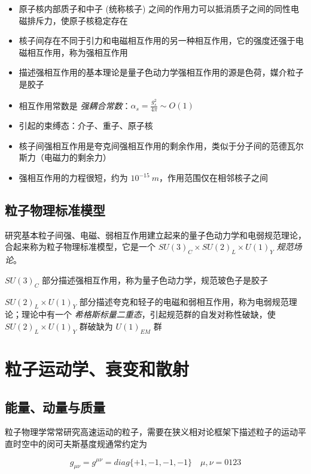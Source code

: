 \documentclass[oneside,a4paper,openany,11pt]{ctexbook}
\begin{document}
\begin{itemize}
    \item 原子核内部质子和中子 (统称核子) 之间的作用力可以抵消质子之间的同性电磁排斥力，使原子核稳定存在
    \item 核子间存在不同于引力和电磁相互作用的另一种相互作用，它的强度还强于电磁相互作用，称为强相互作用
    \item 描述强相互作用的基本理论是量子色动力学强相互作用的源是色荷，媒介粒子是胶子
    \item 相互作用常数是 \emph{强耦合常数}：$\alpha_s=\frac{g_s^2}{4\pi} \sim O(1)$
    \item 引起的束缚态：介子、重子、原子核
    \item 核子间强相互作用是夸克间强相互作用的剩余作用，类似于分子间的范德瓦尔斯力（电磁力的剩余力）
    \item 强相互作用的力程很短，约为 $10^{-15}\ m$，作用范围仅在相邻核子之间
\end{itemize}

\subsection{粒子物理标准模型}

研究基本粒子间强、电磁、弱相互作用建立起来的量子色动力学和电弱规范理论，合起来称为粒子物理标准模型，它是一个 $SU(3)_C \times SU(2)_L \times U(1)_Y$ \emph{规范场论}。

$SU(3)_C$ 部分描述强相互作用，称为量子色动力学，规范玻色子是胶子

$SU(2)_L \times U(1)_Y$ 部分描述夸克和轻子的电磁和弱相互作用，称为电弱规范理论；理论中有一个 \emph{希格斯标量二重态}，引起规范群的自发对称性破缺，使 $SU(2)_L \times U(1)_Y$ 群破缺为 $U(1)_{EM}$ 群

\section{粒子运动学、衰变和散射}

\subsection{能量、动量与质量}

粒子物理学常常研究高速运动的粒子，需要在狭义相对论框架下描述粒子的运动平直时空中的闵可夫斯基度规通常约定为

\begin{equation}
    g_{\mu\nu}=g^{\mu\nu}=diag\{+1,-1,-1,-1\}\quad \mu,\nu=0123
\end{equation}
\end{document}
